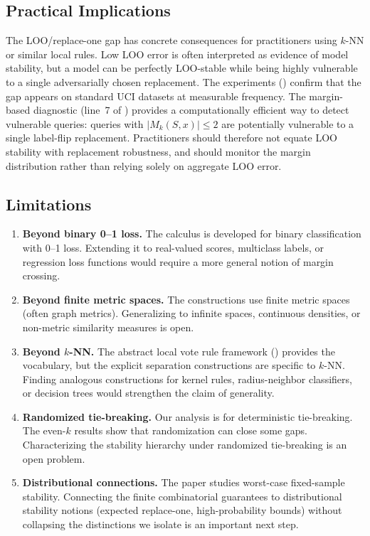 \subsection{Practical Implications}

The LOO/replace-one gap has concrete consequences for practitioners using
$k$-NN or similar local rules. Low LOO error is often interpreted as evidence
of model stability, but a model can be perfectly LOO-stable while being highly
vulnerable to a single adversarially chosen replacement. The experiments
() confirm that the gap appears on standard UCI
datasets at measurable frequency. The margin-based diagnostic (line~7 of
) provides a computationally efficient way to detect
vulnerable queries: queries with $|M_k(S,x)| \le 2$ are potentially vulnerable
to a single label-flip replacement. Practitioners should therefore not equate
LOO stability with replacement robustness, and should monitor the margin
distribution rather than relying solely on aggregate LOO error.

\subsection{Limitations}

\begin{enumerate}[leftmargin=*,label=(\arabic*)]
    \item \textbf{Beyond binary 0--1 loss.} The calculus is developed for
        binary classification with 0--1 loss. Extending it to real-valued
        scores, multiclass labels, or regression loss functions would require
        a more general notion of margin crossing.
    \item \textbf{Beyond finite metric spaces.} The constructions use finite
        metric spaces (often graph metrics). Generalizing to infinite spaces,
        continuous densities, or non-metric similarity measures is open.
    \item \textbf{Beyond $k$-NN.} The abstract local vote rule framework
        () provides the vocabulary, but the
        explicit separation constructions are specific to $k$-NN. Finding
        analogous constructions for kernel rules, radius-neighbor classifiers,
        or decision trees would strengthen the claim of generality.
    \item \textbf{Randomized tie-breaking.} Our analysis is for deterministic
        tie-breaking. The even-$k$ results show that randomization can close
        some gaps. Characterizing the stability hierarchy under randomized
        tie-breaking is an open problem.
    \item \textbf{Distributional connections.} The paper studies worst-case
        fixed-sample stability. Connecting the finite combinatorial guarantees
        to distributional stability notions (expected replace-one,
        high-probability bounds) without collapsing the distinctions we
        isolate is an important next step.
\end{enumerate}

